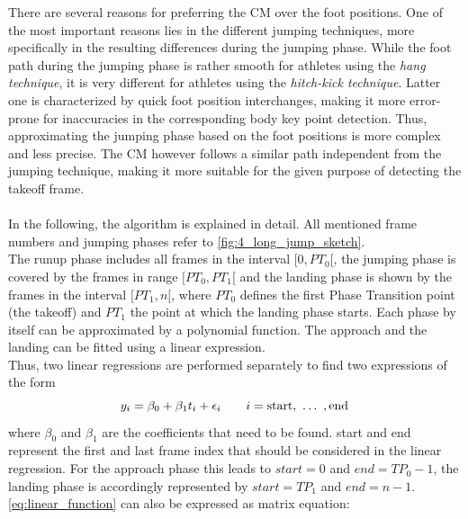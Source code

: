 There are several reasons for preferring the \ac{CM} over the foot positions.
One of the most important reasons lies in the different jumping techniques,
more specifically in the resulting differences during the jumping phase.
While the foot path during the jumping phase is rather smooth for
athletes using the \textit{hang technique}, it is very different for
athletes using the \textit{hitch-kick technique}.
Latter one is characterized by quick foot position interchanges, making it
more error-prone for inaccuracies in the corresponding body key point
detection.
Thus, approximating the jumping phase based on the foot positions is more
complex and less precise.
The \ac{CM} however follows a similar path independent from the jumping
technique, making it more suitable for the given purpose of detecting the
takeoff frame.\\\\
\noindent In the following, the algorithm is explained in detail.
All mentioned frame numbers and jumping phases refer to
\autoref{fig:4_long_jump_sketch}.\\
The runup phase includes all frames in the interval $[0, PT_0[$, the jumping
phase is covered by the frames in range $[PT_0, PT_1[$ and the landing phase
is shown by the frames in the interval $[PT_1, n[$, where $PT_0$ defines the
first Phase Transition point (the takeoff) and $PT_1$ the point at which the
landing phase starts.
Each phase by itself can be approximated by a polynomial function.
The approach and the landing can be fitted using a linear expression.\\
Thus, two linear regressions are performed separately to find two expressions
of the form
\begin{equation}\label{eq:linear_function}
    \\y_i = \beta_0 + \beta_1t_i + \epsilon_i
    \quad\quad
    i = \text{start},\ \dots\ ,\text{end}
\end{equation}
where $\beta_0$ and $\beta_1$ are the coefficients that need to be found.
start and end represent the first and last frame index that should be
considered in the linear regression.
For the approach phase this leads to $start = 0$ and $end = TP_0 - 1$, the
landing phase is accordingly represented by $start = TP_1$ and $end = n - 1$.\\
\autoref{eq:linear_function} can also be expressed as matrix equation:
